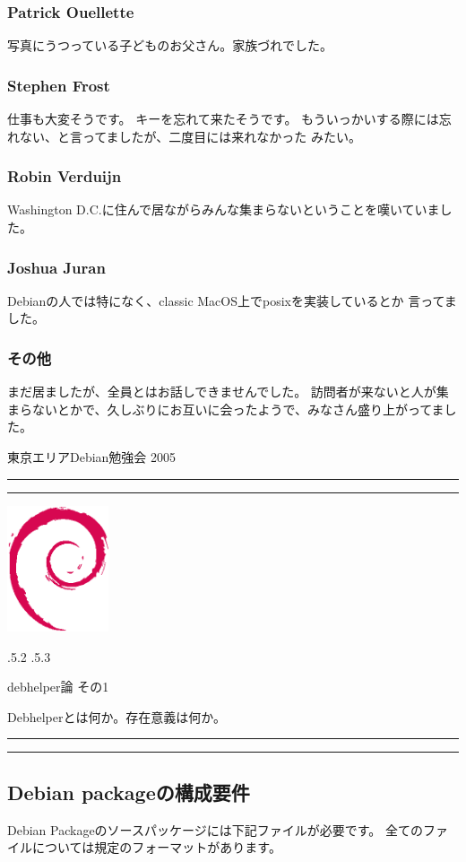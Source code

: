 \documentclass[mingoth]{jsarticle}
\makeatletter
\renewcommand{\section}{\@startsection{section}{1}{\z@}%
    {\Cvs \@plus.5\Cdp \@minus.2\Cdp}%
    {.5\Cvs \@plus.3\Cdp}%
    {\normalfont\Large\headfont\raggedright\centering}} %
\newcommand{\dancersection}[2]{%
\newpage
東京エリアDebian勉強会 2005
\hrule
\vspace{0.5mm}
\hrule
\hfill{}\includegraphics[width=3cm]{image200502/openlogo-nd.eps}\\
\vspace{-4cm}
\begin{center}
  \section{#1}
\end{center}
\hfill{}#2\hspace{3cm}\space\\
\hrule
\hrule
\vspace{1cm}
}
\makeatother
\begin{document}
\subsubsection{Patrick Ouellette}

写真にうつっている子どものお父さん。家族づれでした。

\subsubsection{Stephen Frost}

仕事も大変そうです。
キーを忘れて来たそうです。
もういっかいする際には忘れない、と言ってましたが、二度目には来れなかった
みたい。




\subsubsection{Robin Verduijn}

Washington D.C.に住んで居ながらみんな集まらないということを嘆いていまし
た。

\subsubsection{Joshua Juran}

Debianの人では特になく、classic MacOS上でposixを実装しているとか
言ってました。

\subsubsection{その他}

まだ居ましたが、全員とはお話しできませんでした。
訪問者が来ないと人が集まらないとかで、久しぶりにお互いに会ったようで、みなさん盛り上がってました。


\dancersection{debhelper論 その1}{Debhelperとは何か。存在意義は何か。}

\subsection{Debian packageの構成要件}


Debian Packageのソースパッケージには下記ファイルが必要です。
全てのファイルについては規定のフォーマットがあります。
\end{document}
